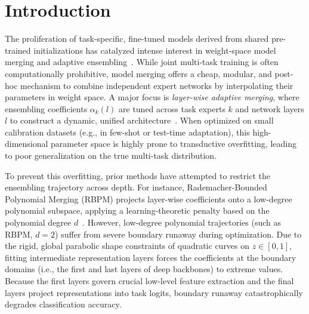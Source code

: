 \section{Introduction}
\label{sec:intro}

The proliferation of task-specific, fine-tuned models derived from shared pre-trained initializations has catalyzed intense interest in weight-space model merging and adaptive ensembling~\cite{ainsworth2022git, wortsman2022model, yadav23ties, yu23dare}. While joint multi-task training is often computationally prohibitive, model merging offers a cheap, modular, and post-hoc mechanism to combine independent expert networks by interpolating their parameters in weight space. A major focus is \emph{layer-wise adaptive merging}, where ensembling coefficients $\alpha_k(l)$ are tuned across task experts $k$ and network layers $l$ to construct a dynamic, unified architecture~\cite{choshen22fusing, chatterjee2024robustness}. When optimized on small calibration datasets (e.g., in few-shot or test-time adaptation), this high-dimensional parameter space is highly prone to transductive overfitting, leading to poor generalization on the true multi-task distribution.

To prevent this overfitting, prior methods have attempted to restrict the ensembling trajectory across depth. For instance, Rademacher-Bounded Polynomial Merging (RBPM) projects layer-wise coefficients onto a low-degree polynomial subspace, applying a learning-theoretic penalty based on the polynomial degree $d$~\cite{chatterjee2024robustness}. However, low-degree polynomial trajectories (such as RBPM, $d=2$) suffer from severe boundary runaway during optimization. Due to the rigid, global parabolic shape constraints of quadratic curves on $z \in [0, 1]$, fitting intermediate representation layers forces the coefficients at the boundary domains (i.e., the first and last layers of deep backbones) to extreme values. Because the first layers govern crucial low-level feature extraction and the final layers project representations into task logits, boundary runaway catastrophically degrades classification accuracy.

